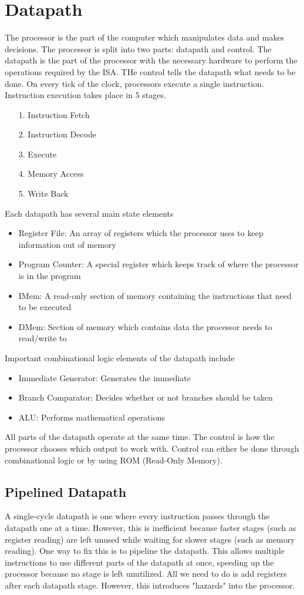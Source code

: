 \documentclass{article}
\begin{document}
\section{Datapath}
The processor is the part of the computer which manipulates data and makes decisions. The processor is split into two parts: datapath and control. 
The datapath is the part of the processor with the necessary hardware to perform the operations required by the ISA. THe control tells the datapath what needs to be done.
On every tick of the clock, processors execute a single instruction. Instruction execution takes place in 5 stages.
\begin{itemize}
    \item[1. ] Instruction Fetch
    \item[2. ] Instruction Decode
    \item[3. ] Execute
    \item[4. ] Memory Access
    \item[5. ] Write Back 
\end{itemize}
Each datapath has several main state elements
\begin{itemize}
    \item Register File: An array of registers which the processor uses to keep information out of memory
    \item Program Counter: A special register which keeps track of where the processor is in the program
    \item IMem: A read-only section of memory containing the instructions that need to be executed
    \item DMem: Section of memory which contains data the processor needs to read/write to
\end{itemize}
Important combinational logic elements of the datapath include
\begin{itemize}
    \item Immediate Generator: Generates the immediate
    \item Branch Comparator: Decides whether or not branches should be taken
    \item ALU: Performs mathematical operations
\end{itemize}
All parts of the datapath operate at the same time. The control is how the processor chooses which output to work with.
Control can either be done through combinational logic or by using ROM (Read-Only Memory).
\subsection{Pipelined Datapath}
A single-cycle datapath is one where every instruction passes through the datapath one at a time. However, this is
inefficient because faster stages (such as register reading) are left unused while waiting for slower stages (such as memory reading).
One way to fix this is to pipeline the datapath. This allows multiple instructions to use different parts of the datapath at once, speeding up the
processor because no stage is left unutilized. All we need to do is add registers after each datapath stage. However, this introduces "hazards" into the processor.
\end{document}
